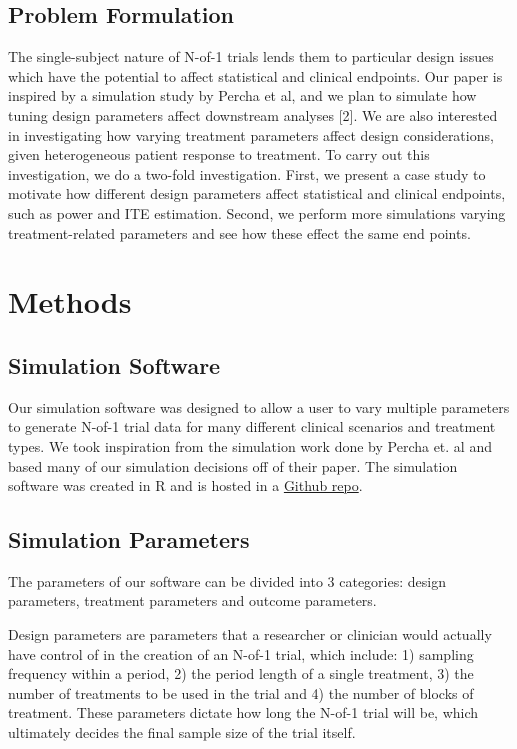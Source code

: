 \documentclass[11pt,]{article}
\begin{document}
\subsection{Problem Formulation}\label{problem-formulation}

The single-subject nature of N-of-1 trials lends them to particular
design issues which have the potential to affect statistical and
clinical endpoints. Our paper is inspired by a simulation study by
Percha et al, and we plan to simulate how tuning design parameters
affect downstream analyses {[}2{]}. We are also interested in
investigating how varying treatment parameters affect design
considerations, given heterogeneous patient response to treatment. To
carry out this investigation, we do a two-fold investigation. First, we
present a case study to motivate how different design parameters affect
statistical and clinical endpoints, such as power and ITE estimation.
Second, we perform more simulations varying treatment-related parameters
and see how these effect the same end points.

\section{Methods}\label{methods}

\subsection{Simulation Software}\label{simulation-software}

Our simulation software was designed to allow a user to vary multiple
parameters to generate N-of-1 trial data for many different clinical
scenarios and treatment types. We took inspiration from the simulation
work done by Percha et. al and based many of our simulation decisions
off of their paper. The simulation software was created in R and is
hosted in a \href{https://github.com/thecbp/n-of-1}{Github repo}.

\subsection{Simulation Parameters}\label{simulation-parameters}

The parameters of our software can be divided into 3 categories: design
parameters, treatment parameters and outcome parameters.

Design parameters are parameters that a researcher or clinician would
actually have control of in the creation of an N-of-1 trial, which
include: 1) sampling frequency within a period, 2) the period length of
a single treatment, 3) the number of treatments to be used in the trial
and 4) the number of blocks of treatment. These parameters dictate how
long the N-of-1 trial will be, which ultimately decides the final sample
size of the trial itself.
\end{document}
